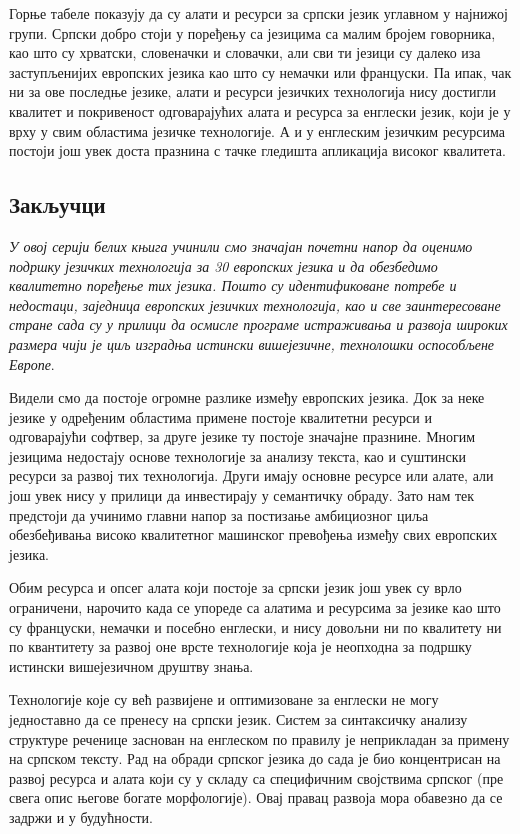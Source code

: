 \begin{multicols}{2}
Горње табеле показују да су алати и ресурси за српски језик углавном у најнижој групи. Српски добро стоји у поређењу са језицима са малим бројем говорника, као што су хрватски, словеначки и словачки, али сви ти језици су далеко иза заступљенијих европских језика као што су немачки или француски. Па ипак, чак ни за ове последње језике, алати и ресурси  језичких технологија нису достигли квалитет и покривеност одговарајућих алата и ресурса за енглески језик, који је у врху у свим областима језичке технологије. А и у енглеским језичким ресурсима постоји још увек доста празнина с тачке гледишта апликација високог квалитета.



 \subsection {Закључци}
   
\textit{У овој серији белих књига учинили смо значајан почетни напор да оценимо подршку језичких технологија за 30 европских језика и да обезбедимо квалитетно поређење тих језика. Пошто су идентификоване потребе и недостаци, заједница европских језичких технологија, као и све заинтересоване стране сада су у прилици да осмисле програме истраживања и развоја широких размера чији је циљ изградња истински вишејезичне,  технолошки оспособљене Европе}.

Видели смо да постоје огромне разлике између европских језика. Док за неке језике у одређеним областима примене постоје квалитетни ресурси и  одговарајући софтвер, за друге језике ту постоје значајне празнине. Многим језицима недостају основе технологије за анализу текста, као и суштински ресурси за развој тих технологија. Други имају основне ресурсе или алате, али још увек нису у прилици да инвестирају у семантичку обраду. Зато нам тек предстоји да учинимо главни напор за постизање амбициозног циља обезбеђивања високо квалитетног машинског превођења између свих европских језика.  

Обим ресурса и опсег алата који постоје за српски језик још увек су врло ограничени, нарочито када се упореде са алатима и ресурсима за језике као што су француски, немачки и посебно енглески, и нису довољни ни по квалитету ни по квантитету за развој оне врсте технологије која је неопходна за подршку истински вишејезичном друштву знања. 

Технологије које су већ развијене и оптимизоване за енглески не могу једноставно да се пренесу на српски језик. Систем за синтаксичку анализу структуре реченице заснован на енглеском по правилу је неприкладан за примену на српском тексту. Рад на обради српског језика до сада је био концентрисан на развој ресурса и алата који су у складу са специфичним својствима српског (пре свега опис његове богате морфологије). Овај правац развоја мора обавезно да се задржи и у будућности. 


\end{multicols}
